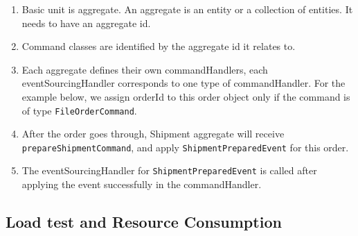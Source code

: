 \begin{enumerate}[i]
    \item Basic unit is aggregate. An aggregate is an entity or a collection of entities. It needs to have an aggregate id.

    

    \item Command classes are identified by the aggregate id it relates to.

    

    \item Each aggregate defines their own commandHandlers, each eventSourcingHandler corresponds to one type of commandHandler. For the example below, we assign orderId to this order object only if the command is of type \texttt{FileOrderCommand}.

    

    \item After the order goes through, Shipment aggregate will receive \texttt{prepareShipmentCommand}, and apply \texttt{ShipmentPreparedEvent} for this order.
    

    \item The eventSourcingHandler for \texttt{ShipmentPreparedEvent} is called after applying the event successfully in the commandHandler.
    
\end{enumerate}

\subsection{Load test and Resource Consumption}

